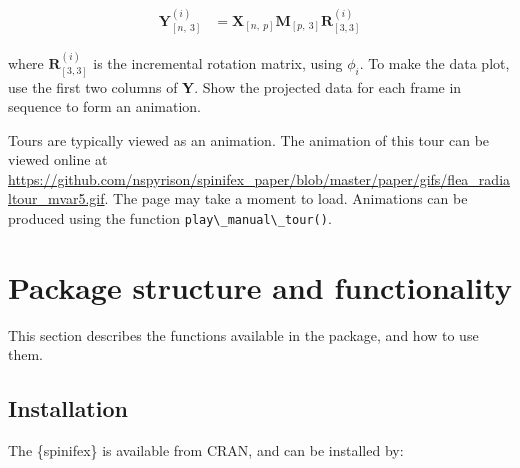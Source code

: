 \documentclass{template/monashthesis}
\begin{document}
\begin{align*}
  \textbf{Y}^{(i)}_{[n,~3]} &= \textbf{X}_{[n,~p]} \textbf{M}_{[p,~3]} \textbf{R}^{(i)}_{[3,3]}
\end{align*}

\noindent where \(\textbf{R}^{(i)}_{[3,3]}\) is the incremental rotation matrix, using \(\phi_i\). To make the data plot, use the first two columns of \textbf{Y}. Show the projected data for each frame in sequence to form an animation.

Tours are typically viewed as an animation. The animation of this tour can be viewed online at \url{https://github.com/nspyrison/spinifex_paper/blob/master/paper/gifs/flea_radialtour_mvar5.gif}. The page may take a moment to load. Animations can be produced using the function \texttt{play\textbackslash{}\_manual\textbackslash{}\_tour()}.

\hypertarget{package-structure-and-functionality}{%
\section{Package structure and functionality}\label{package-structure-and-functionality}}

This section describes the functions available in the package, and how to use them.

\hypertarget{installation}{%
\subsection{Installation}\label{installation}}

The \{spinifex\} is available from CRAN, and can be installed by:

\begin{Shaded}
\begin{Highlighting}[]
\NormalTok{(}\NormalTok{) }
\NormalTok{(}\NormalTok{) }

\NormalTok{(}\NormalTok{)}
\NormalTok{(}\NormalTok{)}
\end{Highlighting}
\end{Shaded}
\end{document}
